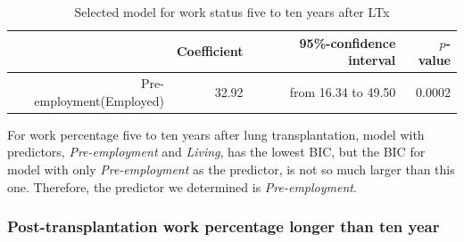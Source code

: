 \documentclass[11pt, a4paper]{article}\usepackage[]{graphicx}\usepackage[]{color}
\begin{document}
{%
\begin{table}[ht]
\centering
\caption{Model selection for work percentage 
               five to ten years after LTx} 
\end{table}



\begin{table}[!h]
\centering
\caption{Selected model for work status five to ten years after LTx} 
\begingroup\footnotesize
\begin{tabular}{rrrr}
  \hline
 & Coefficient & 95\%-confidence interval & $p$-value \\ 
  \hline
Pre-employment(Employed) & 32.92 & from 16.34 to 49.50 & 0.0002 \\ 
   \hline
\end{tabular}
\endgroup
\end{table}


For work percentage five to ten years after lung transplantation, model with predictors, \textit{Pre-employment} and \textit{Living}, has the lowest BIC, but the BIC for model with only \textit{Pre-employment} as the predictor, is not so much larger than this one. Therefore, the predictor we determined is \textit{Pre-employment}.

\clearpage

\subsubsection*{Post-transplantation work percentage longer than ten year} \label{subsubsection:linear5}



}
\end{document}
